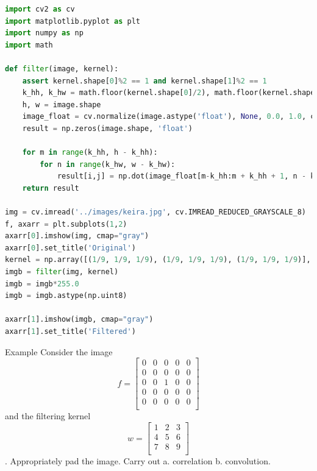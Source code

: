 \begin{frame}{}
    \begin{lstlisting}[caption=Filtering Using Loops, language=Python, escapechar=\@]
%matplotlib inline
import cv2 as cv
import matplotlib.pyplot as plt
import numpy as np
import math

def filter(image, kernel):
    assert kernel.shape[0]%2 == 1 and kernel.shape[1]%2 == 1
    k_hh, k_hw = math.floor(kernel.shape[0]/2), math.floor(kernel.shape[1]/2)
    h, w = image.shape
    image_float = cv.normalize(image.astype('float'), None, 0.0, 1.0, cv.NORM_MINMAX)
    result = np.zeros(image.shape, 'float')

    for m in range(k_hh, h - k_hh):
        for n in range(k_hw, w - k_hw):
            result[i,j] = np.dot(image_float[m-k_hh:m + k_hh + 1, n - k_hw : n + k_hw + 1].flatten(), kernel.flatten())
    return result

img = cv.imread('../images/keira.jpg', cv.IMREAD_REDUCED_GRAYSCALE_8)
f, axarr = plt.subplots(1,2)
axarr[0].imshow(img, cmap="gray")
axarr[0].set_title('Original')
kernel = np.array([(1/9, 1/9, 1/9), (1/9, 1/9, 1/9), (1/9, 1/9, 1/9)], dtype='float')
imgb = filter(img, kernel)
imgb = imgb*255.0
imgb = imgb.astype(np.uint8)

axarr[1].imshow(imgb, cmap="gray")
axarr[1].set_title('Filtered')
    \end{lstlisting}
\end{frame}

\begin{frame}{Example}
    Consider the image
    \begin{equation*}
        f = \begin{bmatrix}
          0 & 0 & 0 & 0 & 0\\
          0 & 0 & 0 & 0 & 0\\
          0 & 0 & 1 & 0 & 0\\
          0 & 0 & 0 & 0 & 0\\
          0 & 0 & 0 & 0 & 0\\
        \end{bmatrix}
    \end{equation*}
    and the filtering kernel
    \begin{equation*}
        w = \begin{bmatrix}
          1 & 2 & 3\\
          4 & 5 & 6\\
          7 & 8 & 9\\
        \end{bmatrix}
    \end{equation*}.
    Appropriately pad the image. Carry out a. correlation b. convolution.
\end{frame}


